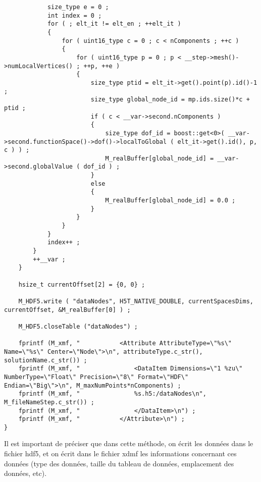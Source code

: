 \documentclass[10pt]{article}
\begin{document}
\begin{lstlisting}
            size_type e = 0 ; 
            int index = 0 ;
            for ( ; elt_it != elt_en ; ++elt_it )
            {
                for ( uint16_type c = 0 ; c < nComponents ; ++c )
                {
                    for ( uint16_type p = 0 ; p < __step->mesh()->numLocalVertices() ; ++p, ++e )
                    {
                        size_type ptid = elt_it->get().point(p).id()-1 ;
                        size_type global_node_id = mp.ids.size()*c + ptid ;
                        if ( c < __var->second.nComponents ) 
                        {
                            size_type dof_id = boost::get<0>( __var->second.functionSpace()->dof()->localToGlobal ( elt_it->get().id(), p, c ) ) ;
                            M_realBuffer[global_node_id] = __var->second.globalValue ( dof_id ) ;
                        }
                        else
                        {
                            M_realBuffer[global_node_id] = 0.0 ;
                        }
                    }
                }
            }
            index++ ;
        }
        ++__var ;
    }

    hsize_t currentOffset[2] = {0, 0} ;

    M_HDF5.write ( "dataNodes", H5T_NATIVE_DOUBLE, currentSpacesDims, currentOffset, &M_realBuffer[0] ) ;

    M_HDF5.closeTable ("dataNodes") ;    

    fprintf (M_xmf, "           <Attribute AttributeType=\"%s\" Name=\"%s\" Center=\"Node\">\n", attributeType.c_str(), solutionName.c_str()) ;
    fprintf (M_xmf, "               <DataItem Dimensions=\"1 %zu\" NumberType=\"Float\" Precision=\"8\" Format=\"HDF\" Endian=\"Big\">\n", M_maxNumPoints*nComponents) ;
    fprintf (M_xmf, "               %s.h5:/dataNodes\n", M_fileNameStep.c_str()) ;
    fprintf (M_xmf, "               </DataItem>\n") ;    
    fprintf (M_xmf, "           </Attribute>\n") ;
}
\end{lstlisting}
Il est important de préciser que dans cette méthode, on écrit les données dans le fichier hdf5, et on écrit dans le fichier xdmf les informations concernant ces données (type des données, taille du tableau de données, emplacement des données, etc).
\end{document}

